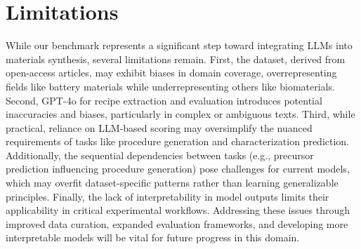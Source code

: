 \section{Limitations}
\label{sec:limitations}

While our benchmark represents a significant step toward integrating LLMs into materials synthesis, several limitations remain. First, the dataset, derived from open-access articles, may exhibit biases in domain coverage, overrepresenting fields like battery materials while underrepresenting others like biomaterials. Second, GPT-4o for recipe extraction and evaluation introduces potential inaccuracies and biases, particularly in complex or ambiguous texts. Third, while practical, reliance on LLM-based scoring may oversimplify the nuanced requirements of tasks like procedure generation and characterization prediction. Additionally, the sequential dependencies between tasks (e.g., precursor prediction influencing procedure generation) pose challenges for current models, which may overfit dataset-specific patterns rather than learning generalizable principles. Finally, the lack of interpretability in model outputs limits their applicability in critical experimental workflows. Addressing these issues through improved data curation, expanded evaluation frameworks, and developing more interpretable models will be vital for future progress in this domain.
 